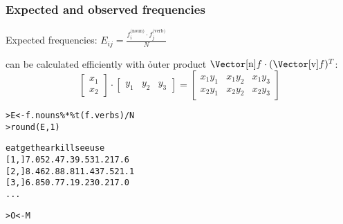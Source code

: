 \begin{frame}[fragile]
  \frametitle{Expected and observed frequencies}

Expected frequencies:
\(\displaystyle
E_{ij} = \frac{f_i^{\text{(noun)}}\cdot f_j^{\text{(verb)}}}{N}
\)

\gap 
can be calculated efficiently with \h{outer product}
$\Vector[\text{n}]{f}\cdot (\Vector[\text{v}]{f})^T$:
\[
\begin{bmatrix}
  x_1 \\ x_2
\end{bmatrix}
\cdot
\begin{bmatrix}
  y_1 & y_2 & y_3
\end{bmatrix}
=
\begin{bmatrix}
  x_1 y_1 & x_1 y_2 & x_1 y_3 \\ 
  x_2 y_1 & x_2 y_2 & x_2 y_3
\end{bmatrix}
\]

\pause
\begin{alltt}\small
> E <- f.nouns \%*\% t(f.verbs) / N
> round(E, 1) \begin{Rout}
      eat   get hear kill  see  use
[1,]  7.0  52.4  7.3  9.5 31.2 17.6
[2,]  8.4  62.8  8.8 11.4 37.5 21.1
[3,]  6.8  50.7  7.1  9.2 30.2 17.0
... \end{Rout}
> O <- M
\end{alltt}
\end{frame}

